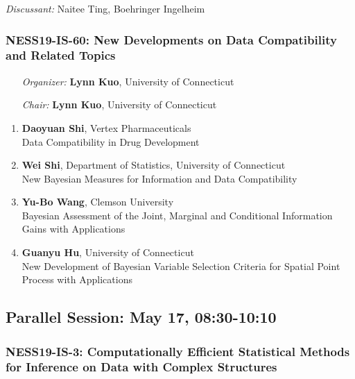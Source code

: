 \emph{Discussant:} Naitee Ting, Boehringer Ingelheim

\subsubsection*{NESS19-IS-60: New Developments on Data Compatibility and Related  Topics}

\begin{enumerate}[align=left]
\item [\emph{Organizer:}] \textbf{Lynn Kuo}, University of Connecticut \\
\item [\emph{Chair:}] \textbf{Lynn Kuo}, University of Connecticut
\end{enumerate}

\begin{enumerate}
\item \textbf{Daoyuan Shi}, Vertex Pharmaceuticals \\
Data Compatibility in Drug Development
\item \textbf{Wei Shi}, Department of Statistics, University of Connecticut \\
New Bayesian Measures for Information and Data Compatibility
\item \textbf{Yu-Bo Wang}, Clemson University \\
Bayesian Assessment of the Joint, Marginal and Conditional Information Gains with Applications
\item \textbf{Guanyu Hu}, University of Connecticut \\
New Development of Bayesian Variable Selection Criteria for Spatial Point Process with Applications
\end{enumerate}

\subsection*{Parallel Session: May 17, 08:30-10:10}

\subsubsection*{NESS19-IS-3: Computationally Efficient Statistical Methods for Inference on Data with Complex Structures}

